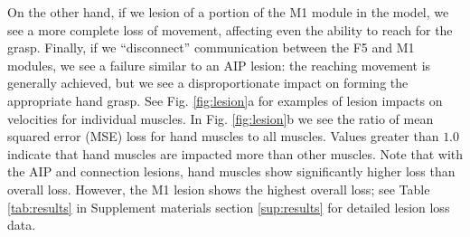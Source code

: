 \documentclass[12pt]{iopart}
\begin{document}
On the other hand, if we lesion of a portion of the M1 module in the model,
we see a more complete loss of movement, affecting even the ability to reach for the grasp.
Finally, if we ``disconnect'' communication between the F5 and M1 modules,
we see a failure similar to an AIP lesion: the reaching movement is generally achieved, but
we see a disproportionate impact on forming the appropriate hand grasp. See Fig.
\ref{fig:lesion}a for examples of lesion impacts on velocities for individual muscles.
In Fig. \ref{fig:lesion}b we see the ratio of mean squared error (MSE) loss for hand
muscles to all muscles. Values greater than $1.0$ indicate that hand muscles are impacted more
than other muscles. Note that with the AIP and connection lesions, hand muscles show significantly
higher loss than overall loss. However, the M1 lesion shows the highest overall loss; see Table
\ref{tab:results} in Supplement materials section \ref{sup:results} for detailed lesion loss data. 
\end{document}
